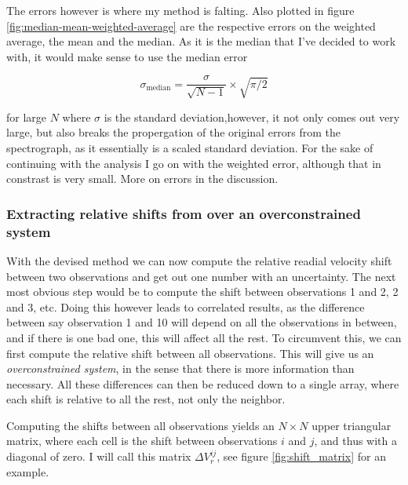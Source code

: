     The errors however is where my method is falting. Also plotted in figure \ref{fig:median-mean-weighted-average} are the respective errors on the weighted average, the mean and the median. As it is the median that I've decided to work with, it would make sense to use the median error 
    
    $$
        \sigma_{\text{median}} = \frac{\sigma}{\sqrt{N-1}} \times \sqrt{\pi/2}
    $$
    
    for large $N$ where $\sigma$ is the standard deviation,however, it not only comes out very large, but also breaks the propergation of the original errors from the spectrograph, as it essentially is a scaled standard deviation. For the sake of continuing with the analysis I go on with the weighted error, although that in constrast is very small. More on errors in the discussion.
    
    \subsubsection{Extracting relative shifts from over an overconstrained system}
    
    With the devised method we can now compute the relative readial velocity shift between two observations and get out one number with an uncertainty. The next most obvious step would be to compute the shift between observations 1 and 2, 2 and 3, etc. Doing this however leads to correlated results, as the difference between say observation 1 and 10 will depend on all the observations in between, and if there is one bad one, this will affect all the rest. To circumvent this, we can first compute the relative shift between all observations. This will give us an \emph{overconstrained system}, in the sense that there is more information than necessary. All these differences can then be reduced down to a single array, where each shift is relative to all the rest, not only the neighbor. 
    
    Computing the shifts between all observations yields an $N\times N$ upper triangular matrix, where each cell is the shift between observations $i$ and $j$, and thus with a diagonal of zero. I will call this matrix $\Delta V_r^{ij}$, see figure \ref{fig:shift_matrix} for an example.
    
